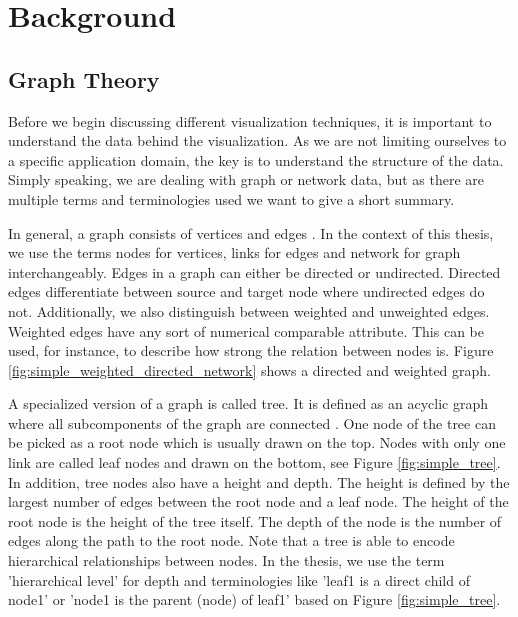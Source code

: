 \chapter{Background}

\section{Graph Theory}
\label{chap:bg-graphTheory}
Before we begin discussing different visualization techniques, it is important to understand the data behind the visualization. As we are not limiting ourselves to a specific application domain, the key is to understand the structure of the data. Simply speaking, we are dealing with graph or network data, but as there are multiple terms and terminologies used we want to give a short summary. 

In general, a graph consists of vertices and edges \cite{diestel_graph_2017}. In the context of this thesis, we use the terms nodes for vertices, links for edges and network for graph interchangeably. Edges in a graph can either be directed or undirected. Directed edges differentiate between source and target node where undirected edges do not. Additionally, we also distinguish between weighted and unweighted edges. Weighted edges have any sort of numerical comparable attribute. This can be used, for instance, to describe how strong the relation between nodes is. Figure \ref{fig:simple_weighted_directed_network} shows a directed and weighted graph.

A specialized version of a graph is called tree\label{exp:tree}. It is defined as an acyclic graph where all subcomponents of the graph are connected \cite{diestel_graph_2017}. One node of the tree can be picked as a root node which is usually drawn on the top. Nodes with only one link are called leaf nodes and drawn on the bottom, see Figure \ref{fig:simple_tree}.\\
In addition, tree nodes also have a height and depth. The height is defined by the largest number of edges between the root node and a leaf node. The height of the root node is the height of the tree itself. The depth of the node is the number of edges along the path to the root node. Note that a tree is able to encode hierarchical relationships between nodes. In the thesis, we use the term 'hierarchical level' for depth and terminologies like 'leaf1 is a direct child of node1' or 'node1 is the parent (node) of leaf1' based on Figure \ref{fig:simple_tree}.

